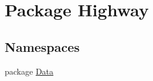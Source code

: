 \hypertarget{namespace_highway}{\section{Package Highway}
\label{namespace_highway}
}
\subsection*{Namespaces}
\begin{DoxyCompactItemize}
\item 
package \hyperlink{namespace_highway_1_1_data}{Data}
\end{DoxyCompactItemize}
